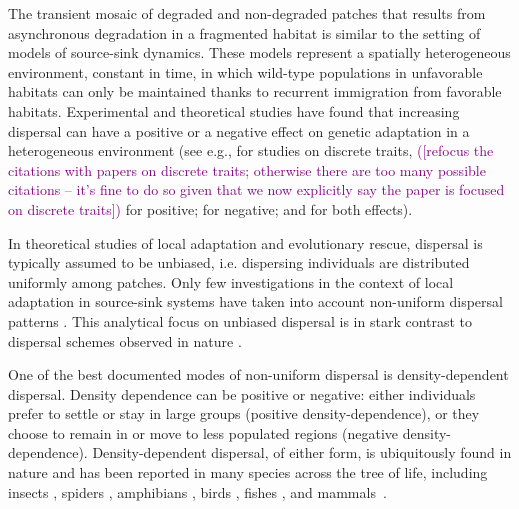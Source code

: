 \documentclass[a4paper,11pt]{article}
\newcommand{\florence}[1]{\textcolor{purple}{(#1)}} %
\newcommand{\chg}[1]{\textcolor{change}{#1}}
\begin{document}
The transient mosaic of degraded and non-degraded patches that results from asynchronous degradation in a fragmented habitat is similar to the setting of models of source-sink dynamics. These models represent a spatially heterogeneous environment, constant in time, in which wild-type populations in unfavorable habitats can only be maintained thanks to recurrent immigration from favorable habitats. 
Experimental and theoretical studies have found that \chg{increasing} dispersal can have a positive or a negative effect on genetic adaptation in a heterogeneous environment (see e.g., for studies on discrete traits, \florence{[refocus the citations with papers on discrete traits; otherwise there are too many possible citations -- it's fine to do so given that we now explicitly say the paper is focused on discrete traits]}\citet{holt_1997,gomulkiewicz_1999} for positive; \citet{storfer_1998,garcia_1997,kirkpatrick_1997,fedorka_2012} for negative; and \chg{\citet{kawecki_2000, gallet_2018}} for both effects).

In theoretical studies of local adaptation and evolutionary rescue, dispersal is typically assumed to be \chg{unbiased}, i.e. dispersing individuals are distributed uniformly among patches. Only few investigations in the context of local adaptation in source-sink systems have taken into account non-\chg{uniform} dispersal patterns \citep[e.g.][]{kawecki_1995,holt_1996,kawecki_2002,amarasekare_2004}. This analytical focus on \chg{unbiased} dispersal is in stark contrast to dispersal schemes observed in nature \citep[][]{edelaar_2008,clobert_2009,edelaar_2012}. 

One of the best documented modes of non-\chg{uniform} dispersal is density-dependent dispersal. Density dependence can be positive or negative: either individuals prefer to settle or stay in large groups (positive density-dependence), or they choose to remain in or move to less populated regions (negative density-dependence). Density-dependent dispersal, of either form, is ubiquitously found in nature and has been reported in many species across the tree of life, including insects \citep{endriss_2019}, spiders \citep{meester2010}, amphibians \citep{gautier_2006}, birds \citep{wilson_2017}, fishes \citep{turgeon_2012}, and mammals~\citep{stoen_2006}.
\end{document}
